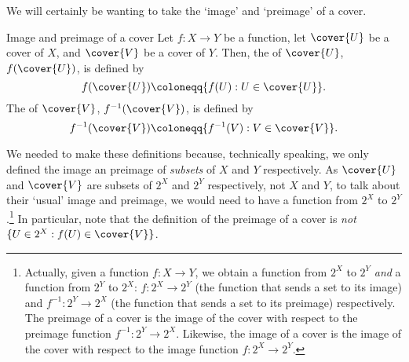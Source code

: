We will certainly be wanting to take the `image' and `preimage' of a cover.
\begin{dfn}{Image and preimage of a cover}{}
Let $f\colon X\rightarrow Y$ be a function, let $\cover{U}$ be a cover of $X$, and $\cover{V}$ be a cover of $Y$.  Then, the  of $\cover{U}$, $f(\cover{U})$, is defined by
\begin{equation}
f(\cover{U})\coloneqq \{ f(U):U\in \cover{U}\} .
\end{equation}
The  of $\cover{V}$, $f^{-1}(\cover{V})$, is defined by
\begin{equation}
f^{-1}(\cover{V})\coloneqq \{ f^{-1}(V):V\in \cover{V}\} .
\end{equation}
\begin{rmk}
We needed to make these definitions because, technically speaking, we only defined the image an preimage of \emph{subsets} of $X$ and $Y$ respectively.  As $\cover{U}$ and $\cover{V}$ are subsets of $2^X$ and $2^Y$ respectively, not $X$ and $Y$, to talk about their `usual' image and preimage, we would need to have a function from $2^X$ to $2^Y$.\footnote{Actually, given a function $f\colon X\rightarrow Y$, we obtain a function from $2^X$ to $2^Y$ \emph{and} a function from $2^Y$ to $2^X$:  $f\colon 2^X\rightarrow 2^Y$ (the function that sends a set to its image) and $f^{-1}:2^Y\rightarrow 2^X$ (the function that sends a set to its preimage) respectively.  The preimage of a cover is the image of the cover with respect to the preimage function $f^{-1}:2^Y\rightarrow 2^X$.  Likewise, the image of a cover is the image of the cover with respect to the image function $f\colon 2^X\rightarrow 2^Y$.}  In particular, note that the definition of the preimage of a cover is \emph{not} $\{ U\in 2^X:f(U)\in \cover{V}\}$.
\end{rmk}
\end{dfn}

